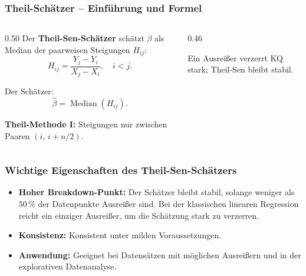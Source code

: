 \documentclass{beamer}
\newif\ifpauseswitch
\begin{document}
	
	\begin{frame}
		\frametitle{Theil-Schätzer – Einführung und Formel}
		
		\begin{columns}[T]
			\begin{column}{0.50\textwidth}
				Der \textbf{Theil-Sen-Schätzer} schätzt $\beta$ als Median der paarweisen Steigungen $H_{ij}$:
				\[
				H_{ij} = \frac{Y_j - Y_i}{X_j - X_i}, \quad i < j.
				\]
				
				\ifpauseswitch
				\pause
				\fi
				
				Der Schätzer:
				\[
				\hat{\beta} = \operatorname{Median}(H_{ij}).
				\]
				
				{\small\textbf{Theil-Methode I:} Steigungen nur zwischen Paaren $(i,\, i{+}n/2)$.}
			\end{column}
			\begin{column}{0.46\textwidth}
				\centering
				{\tiny Ein Ausreißer verzerrt KQ stark; Theil-Sen bleibt stabil.}
			\end{column}
		\end{columns}
	\end{frame}
	
	
	\begin{frame}
		\frametitle{Wichtige Eigenschaften des Theil-Sen-Schätzers}
		
		\begin{itemize}
			\itemsep10pt
			\item \textbf{Hoher Breakdown-Punkt:} Der Schätzer bleibt stabil, solange weniger als $50\,\%$ der Datenpunkte Ausreißer sind. Bei der klassischen linearen Regression reicht ein einziger Ausreißer, um die Schätzung stark zu verzerren.
			\item \textbf{Konsistenz:} Konsistent unter milden Voraussetzungen.
			\item \textbf{Anwendung:} Geeignet bei Datensätzen mit möglichen Ausreißern und in der explorativen Datenanalyse.
		\end{itemize}
	\end{frame}
	
\end{document}
